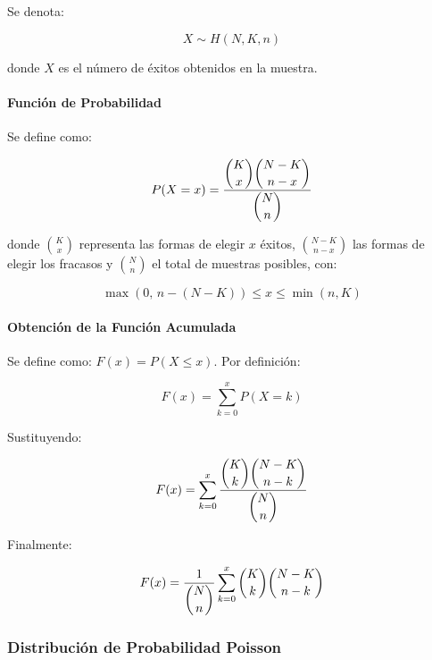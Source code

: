 \documentclass{article}
\begin{document}
Se denota:

\begin{equation}
    X \sim H(N, K, n)
\end{equation}

donde $X$ es el número de éxitos obtenidos en la muestra.

\paragraph{Función de Probabilidad}

Se define como:

\begin{equation}
    P(X = x) = \frac{\dbinom{K}{x}\dbinom{N-K}{n-x}}{\dbinom{N}{n}}
\end{equation}

donde $\binom{K}{x}$ representa las formas de elegir $x$ éxitos, $\binom{N-K}{n-x}$ las formas de
elegir los fracasos y $\binom{N}{n}$ el total de muestras posibles, con:

\begin{equation}
    \max(0,\, n - (N - K)) \leq x \leq \min(n, K)
\end{equation}

\paragraph{Obtención de la Función Acumulada}

Se define como: $F(x) = P(X \leq x)$. Por definición:

\begin{equation}
    F(x) = \sum_{k=0}^{x} P(X = k)
\end{equation}

Sustituyendo:

\begin{equation}
    F(x) = \sum_{k=0}^{x} \frac{\dbinom{K}{k}\dbinom{N-K}{n-k}}{\dbinom{N}{n}}
\end{equation}

Finalmente:

\begin{equation}
    F(x) = \frac{1}{\dbinom{N}{n}} \sum_{k=0}^{x} \binom{K}{k}\binom{N-K}{n-k}
\end{equation}


\subsubsection{Distribución de Probabilidad Poisson}
\end{document}
